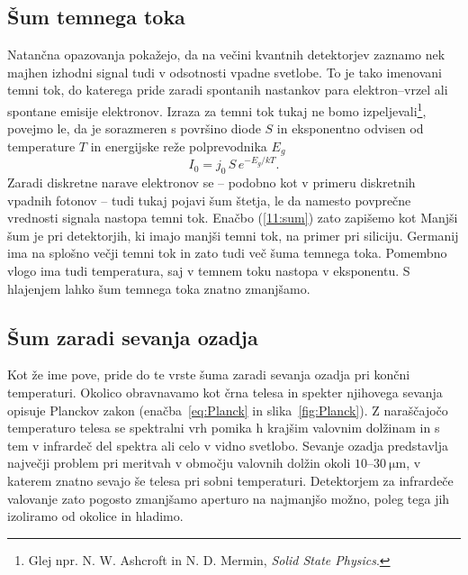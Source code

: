 \subsection*{Šum temnega toka} 
Natančna opazovanja pokažejo, da na večini kvantnih detektorjev zaznamo 
nek majhen izhodni signal tudi v odsotnosti vpadne svetlobe. 
To je tako imenovani temni tok, do katerega pride zaradi
spontanih nastankov para elektron--vrzel ali spontane emisije elektronov. 
Izraza za temni tok tukaj ne bomo 
izpeljevali\footnote{Glej npr. N. W. Ashcroft in N. D. Mermin, {\it Solid State Physics}.},
povejmo le, da je sorazmeren s površino diode $S$ in 
eksponentno odvisen od temperature $T$ in energijske reže polprevodnika $E_g$
\begin{equation}
I_0 = j_0\, S\, e^{-E_g/kT}.
\end{equation}
Zaradi diskretne narave elektronov se -- podobno
kot v primeru diskretnih vpadnih fotonov -- tudi tukaj pojavi šum štetja, le da 
namesto povprečne vrednosti signala nastopa temni tok. 
Enačbo (\ref{11:sum}) zato zapišemo kot 
Manjši šum je pri detektorjih, ki imajo manjši temni tok, na primer pri siliciju.
Germanij  ima na splošno večji temni tok in zato tudi več šuma temnega toka. Pomembno
vlogo ima tudi temperatura, saj v temnem toku nastopa v eksponentu. S hlajenjem lahko 
šum temnega toka znatno zmanjšamo. 

\subsection*{Šum zaradi sevanja ozadja}
Kot že ime pove, pride do te vrste šuma zaradi sevanja ozadja pri končni temperaturi.
Okolico obravnavamo kot črna telesa 
in spekter njihovega sevanja opisuje Planckov 
zakon (enačba~\ref{eq:Planck} in slika~\ref{fig:Planck}). Z naraščajočo temperaturo telesa se 
spektralni vrh pomika h krajšim valovnim dolžinam in s tem 
v infrardeč del spektra ali celo v vidno svetlobo. 
Sevanje ozadja predstavlja največji problem pri meritvah v
območju valovnih dolžin okoli $10$--$30~\si{\micro\meter}$, v katerem znatno sevajo še telesa 
pri sobni temperaturi. Detektorjem za infrardeče valovanje zato pogosto zmanjšamo aperturo 
na najmanjšo možno, poleg tega jih izoliramo od okolice in hladimo. 

